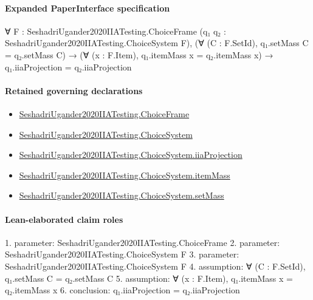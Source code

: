 \documentclass[10pt]{article}
\begin{document}
\paragraph{Expanded PaperInterface specification}
\begin{ReviewVerbatim}
∀ {F : SeshadriUgander2020IIATesting.ChoiceFrame} (q₁ q₂ : SeshadriUgander2020IIATesting.ChoiceSystem F),
  (∀ (C : F.SetId), q₁.setMass C = q₂.setMass C) →
    (∀ (x : F.Item), q₁.itemMass x = q₂.itemMass x) → q₁.iiaProjection = q₂.iiaProjection
\end{ReviewVerbatim}

\paragraph{Retained governing declarations}
\begin{itemize}\raggedright
\item \hyperlink{paper-prerequisite-0b24d39c6f4d1898}{Seshadri\allowbreak{}Ugander2020\allowbreak{}IIA\allowbreak{}Testing.\allowbreak{}Choice\allowbreak{}Frame}
\item \hyperlink{paper-prerequisite-5dca52f4dfdd597a}{Seshadri\allowbreak{}Ugander2020\allowbreak{}IIA\allowbreak{}Testing.\allowbreak{}Choice\allowbreak{}System}
\item \hyperlink{governing-declaration-7943e22bc1b3b7eb}{Seshadri\allowbreak{}Ugander2020\allowbreak{}IIA\allowbreak{}Testing.\allowbreak{}Choice\allowbreak{}System.\allowbreak{}iia\allowbreak{}Projection}
\item \hyperlink{governing-declaration-cc818a627418801f}{Seshadri\allowbreak{}Ugander2020\allowbreak{}IIA\allowbreak{}Testing.\allowbreak{}Choice\allowbreak{}System.\allowbreak{}item\allowbreak{}Mass}
\item \hyperlink{governing-declaration-9ff133256135ea8b}{Seshadri\allowbreak{}Ugander2020\allowbreak{}IIA\allowbreak{}Testing.\allowbreak{}Choice\allowbreak{}System.\allowbreak{}set\allowbreak{}Mass}
\end{itemize}
\paragraph{Lean-elaborated claim roles}\begin{ReviewVerbatim}
1. parameter: SeshadriUgander2020IIATesting.ChoiceFrame
2. parameter: SeshadriUgander2020IIATesting.ChoiceSystem F
3. parameter: SeshadriUgander2020IIATesting.ChoiceSystem F
4. assumption: ∀ (C : F.SetId), q₁.setMass C = q₂.setMass C
5. assumption: ∀ (x : F.Item), q₁.itemMass x = q₂.itemMass x
6. conclusion: q₁.iiaProjection = q₂.iiaProjection
\end{ReviewVerbatim}
\end{document}
